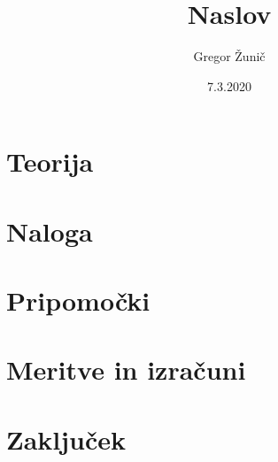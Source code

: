 \documentclass[12pt,a4paper]{article}
\title{\bf{Naslov}}
\author{Gregor Žunič}
\date{7.3.2020}
\begin{document}
\maketitle
\newpage

\newpage
\section{Teorija}
\label{sec: teorija}


\section{Naloga}
\label{sec: naloga}


\section{Pripomočki}
\label{sec: pripomocki}


\section{Meritve in izračuni}
\label{sec: meritve}


\section{Zaključek}
\end{document}
